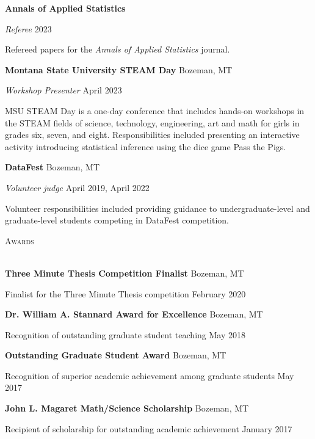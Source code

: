 \documentclass[a4paper]{article}
\newcommand{\lineunder} {
	\vspace*{-8pt} \\
	\hspace*{-18pt} \hrulefill \\
}
\newcommand{\header} [1] {
	{\hspace*{-18pt}\vspace*{6pt} \textcolor{Cerulean}{\textsc{#1}}}
	\vspace*{-6pt} \textcolor{Cerulean}{\lineunder}
}
\begin{document}
\textbf{Annals of Applied Statistics}

\emph{Referee} \hfill 2023

Refereed papers for the \emph{Annals of Applied Statistics} journal.
\vspace*{2mm}

\textbf{Montana State University STEAM Day} \hfill Bozeman, MT

\emph{Workshop Presenter} \hfill April 2023

MSU STEAM Day is a one-day conference that includes hands-on workshops
in the STEAM fields of science, technology, engineering, art and math
for girls in grades six, seven, and eight. Responsibilities included
presenting an interactive activity introducing statistical inference
using the dice game Pass the Pigs. \vspace*{2mm}

\textbf{DataFest} \hfill Bozeman, MT

\emph{Volunteer judge} \hfill April 2019, April 2022

Volunteer responsibilities included providing guidance to
undergraduate-level and graduate-level students competing in DataFest
competition. \vspace*{2mm}

\header{Awards}
\vspace*{2mm}

\textbf{Three Minute Thesis Competition Finalist} \hfill Bozeman, MT

Finalist for the Three Minute Thesis competition \hfill February 2020

\vspace*{2mm}

\textbf{Dr. William A. Stannard Award for Excellence} \hfill Bozeman, MT

Recognition of outstanding graduate student teaching \hfill May 2018

\vspace*{2mm}

\textbf{Outstanding Graduate Student Award} \hfill Bozeman, MT

Recognition of superior academic achievement among graduate students
\hfill May 2017

\vspace*{2mm}

\textbf{John L. Magaret Math/Science Scholarship} \hfill Bozeman, MT

Recipient of scholarship for outstanding academic achievement
\hfill January 2017
\end{document}
